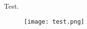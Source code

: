 \documentclass{article}
\begin{document}
Test.
\begin{figure}
\texttt{[image: test.png]}
\label{fig:test}
\end{figure}
\end{document}
